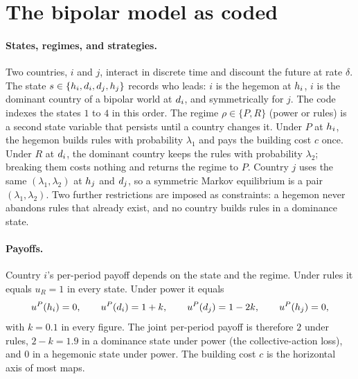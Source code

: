 \section{The bipolar model as coded}
\label{sec:model}

\paragraph*{States, regimes, and strategies.}
Two countries, $i$ and $j$, interact in discrete time and discount the future
at rate $\delta$. The state $s \in \{h_i, d_i, d_j, h_j\}$ records who leads:
$i$ is the hegemon at $h_i$, $i$ is the dominant country of a bipolar world
at $d_i$, and symmetrically for $j$. The code indexes the states $1$ to $4$
in this order. The regime $\rho \in \{P, R\}$ (power or rules) is a second
state variable that persists until a country changes it. Under $P$ at $h_i$,
the hegemon builds rules with probability $\lambda_1$ and pays the building
cost $c$ once. Under $R$ at $d_i$, the dominant country keeps the rules with
probability $\lambda_2$; breaking them costs nothing and returns the regime
to $P$. Country $j$ uses the same $(\lambda_1, \lambda_2)$ at $h_j$ and
$d_j$, so a symmetric Markov equilibrium is a pair $(\lambda_1, \lambda_2)$.
Two further restrictions are imposed as constraints: a hegemon never
abandons rules that already exist, and no country builds rules in a
dominance state.

\paragraph*{Payoffs.}
Country $i$'s per-period payoff depends on the state and the regime.
Under rules it equals $u_R = 1$ in every state. Under power it equals
\begin{align*}
  u^P(h_i) = 0, \qquad u^P(d_i) = 1 + k, \qquad u^P(d_j) = 1 - 2k, \qquad u^P(h_j) = 0,
\end{align*}
with $k = 0.1$ in every figure. The joint per-period payoff is therefore
$2$ under rules, $2 - k = 1.9$ in a dominance state under power (the
collective-action loss), and $0$ in a hegemonic state under power. The
building cost $c$ is the horizontal axis of most maps.

